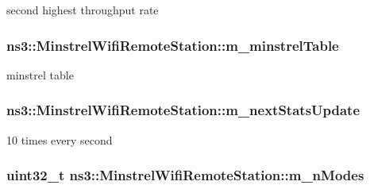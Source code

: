 second highest throughput rate 

\subsubsection[{\texorpdfstring{m\+\_\+minstrel\+Table}{m_minstrelTable}}]{ ns3\+::\+Minstrel\+Wifi\+Remote\+Station\+::m\+\_\+minstrel\+Table}\hypertarget{structns3_1_1MinstrelWifiRemoteStation_a8c33890de7ab95a96169542fd2b5a1cb}{}\label{structns3_1_1MinstrelWifiRemoteStation_a8c33890de7ab95a96169542fd2b5a1cb}


minstrel table 

\subsubsection[{\texorpdfstring{m\+\_\+next\+Stats\+Update}{m_nextStatsUpdate}}]{ ns3\+::\+Minstrel\+Wifi\+Remote\+Station\+::m\+\_\+next\+Stats\+Update}\hypertarget{structns3_1_1MinstrelWifiRemoteStation_a39b3f9b67725127612483b1df852e5e8}{}\label{structns3_1_1MinstrelWifiRemoteStation_a39b3f9b67725127612483b1df852e5e8}


10 times every second 

\subsubsection[{\texorpdfstring{m\+\_\+n\+Modes}{m_nModes}}]{\setlength{\rightskip}{0pt plus 5cm}uint32\+\_\+t ns3\+::\+Minstrel\+Wifi\+Remote\+Station\+::m\+\_\+n\+Modes}\hypertarget{structns3_1_1MinstrelWifiRemoteStation_af1bbcaea8a95b3bb2aba494b0f568598}{}\label{structns3_1_1MinstrelWifiRemoteStation_af1bbcaea8a95b3bb2aba494b0f568598}


